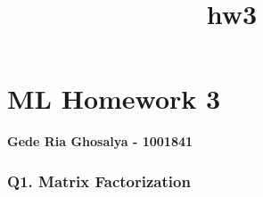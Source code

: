 \documentclass[11pt]{article}
\title{hw3}
\begin{document}
    
    
    \maketitle
    
    

    
    \section{ML Homework 3}\label{ml-homework-3}

\textbf{Gede Ria Ghosalya - 1001841}

    \subsubsection{Q1. Matrix Factorization}\label{q1.-matrix-factorization}
\end{document}
